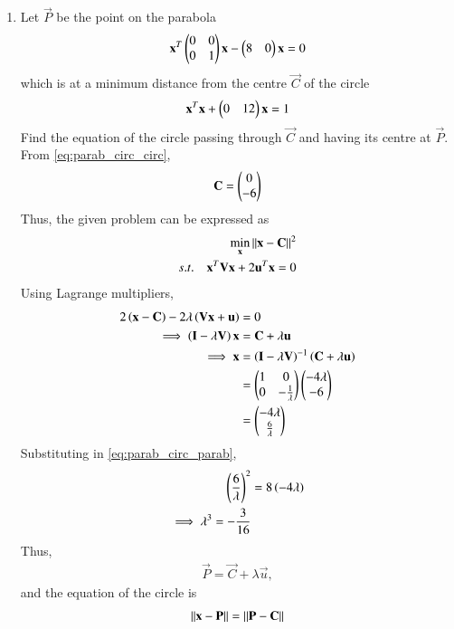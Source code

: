 \documentclass[journal,12pt,twocolumn]{IEEEtran}
\begin{document}
\begin{enumerate}[label=\arabic*]
\item Let $\vec{P}$ be the point on the parabola
\begin{equation}
\label{eq:parab_circ_parab}
\mathbf{x}^T\begin{pmatrix}0 & 0 \\ 0 & 1\end{pmatrix}\mathbf{x} -\begin{pmatrix}8 & 0 \end{pmatrix}\mathbf{x} 
 = 0
\end{equation}
which is at a minimum distance from the centre $\vec{C}$ of the circle
\begin{equation}
\label{eq:parab_circ_circ}
\mathbf{x}^T\mathbf{x} +\begin{pmatrix}0 & 12 \end{pmatrix}\mathbf{x} 
 = 1 
\end{equation} 
Find the equation of the circle passing through $\vec{C}$ and having its centre at $\vec{P}$. 
\\
\solution From \eqref{eq:parab_circ_circ},
\begin{align}
\mathbf{C} = \begin{pmatrix}0 \\ -6\end{pmatrix}
\end{align}
%
Thus, the given problem can be expressed as 
\begin{align}
\min_{\mathbf{x}}\left\Vert\mathbf{x}-\mathbf{C}\right\Vert^2
\\
s.t.\quad \mathbf{x}^T\mathbf{V}\mathbf{x}+2\mathbf{u}^T\mathbf{x} =0
\end{align}
%
Using Lagrange multipliers,
\begin{align}
2\left(\mathbf{x}-\mathbf{C}\right)-2\lambda \left(\mathbf{V}\mathbf{x}+\mathbf{u}\right) &= 0
\\
\implies \left(\mathbf{I}-\lambda \mathbf{V}\right)\mathbf{x} &=\mathbf{C}+\lambda\mathbf{u}
\\
\implies \mathbf{x} &= \left(\mathbf{I}-\lambda \mathbf{V}\right)^{-1}\left(\mathbf{C}+\lambda\mathbf{u}\right)
\\
&=\begin{pmatrix}1 & 0 \\ 0 & -\frac{1}{\lambda}\end{pmatrix}\begin{pmatrix}-4\lambda \\ -6\end{pmatrix}
\\
&=\begin{pmatrix}-4\lambda \\ \frac{6}{\lambda}\end{pmatrix}
\end{align}
%
Substituting in \eqref{eq:parab_circ_parab},
\begin{align}
\left(\frac{6}{\lambda}\right)^2 &= 8\left(-4\lambda\right)
\\
\implies \lambda^3 =- \frac{3}{16}
\end{align}
%
Thus, 
\begin{align}
\vec{P} = \vec{C}+\lambda\vec{u},
\end{align}
and the equation of the circle is
\begin{align}
\left\Vert\mathbf{x}-\mathbf{P}\right\Vert=\left\Vert\mathbf{P}-\mathbf{C}\right\Vert
\end{align}

\end{enumerate}
\end{document}

